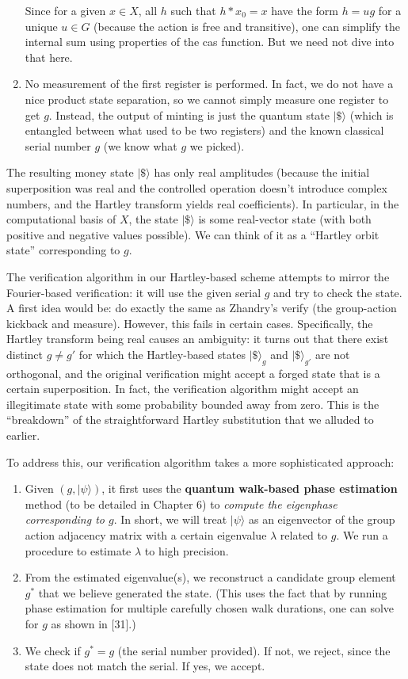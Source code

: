 \documentclass[12pt]{report}
\begin{document}
\begin{enumerate}
\[    \] 
    Since for a given $x\in X$, all $h$ such that $h*x_0=x$ have the form $h = u g$ for a unique $u \in G$ (because the action is free and transitive), one can simplify the internal sum using properties of the cas function. But we need not dive into that here.
    \item No measurement of the first register is performed. In fact, we do not have a nice product state separation, so we cannot simply measure one register to get $g$. Instead, the output of minting is just the quantum state $|\$\rangle$ (which is entangled between what used to be two registers) and the known classical serial number $g$ (we know what $g$ we picked).
\end{enumerate}

The resulting money state $|\$\rangle$ has only real amplitudes (because the initial superposition was real and the controlled operation doesn’t introduce complex numbers, and the Hartley transform yields real coefficients). In particular, in the computational basis of $X$, the state $|\$\rangle$ is some real-vector state (with both positive and negative values possible). We can think of it as a “Hartley orbit state” corresponding to $g$.

The verification algorithm in our Hartley-based scheme attempts to mirror the Fourier-based verification: it will use the given serial $g$ and try to check the state. A first idea would be: do exactly the same as Zhandry’s verify (the group-action kickback and measure). However, this fails in certain cases. Specifically, the Hartley transform being real causes an ambiguity: it turns out that there exist distinct $g \neq g'$ for which the Hartley-based states $|\$\rangle_g$ and $|\$\rangle_{g'}$ are not orthogonal, and the original verification might accept a forged state that is a certain superposition. In fact, the verification algorithm might accept an illegitimate state with some probability bounded away from zero. This is the “breakdown” of the straightforward Hartley substitution that we alluded to earlier.

To address this, our verification algorithm takes a more sophisticated approach:
\begin{enumerate}
    \item Given $(g, |\psi\rangle)$, it first uses the \textbf{quantum walk-based phase estimation} method (to be detailed in Chapter 6) to \emph{compute the eigenphase corresponding to $g$}. In short, we will treat $|\psi\rangle$ as an eigenvector of the group action adjacency matrix with a certain eigenvalue $\lambda$ related to $g$. We run a procedure to estimate $\lambda$ to high precision.
    \item From the estimated eigenvalue(s), we reconstruct a candidate group element $g^*$ that we believe generated the state. (This uses the fact that by running phase estimation for multiple carefully chosen walk durations, one can solve for $g$ as shown in [31].)
    \item We check if $g^* = g$ (the serial number provided). If not, we reject, since the state does not match the serial. If yes, we accept.
\end{enumerate}
\end{document}

